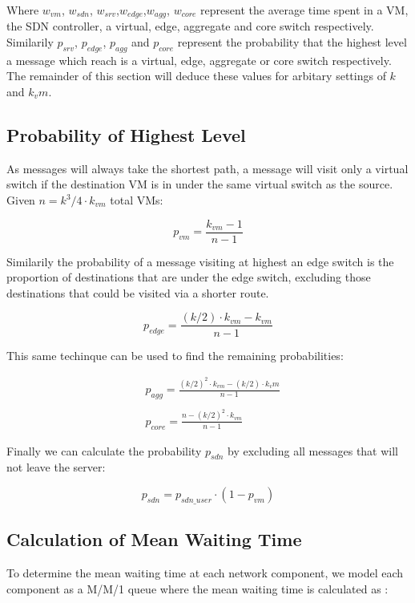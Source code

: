Where $w_{vm}$, $w_{sdn}$, $w_{srv}$,$w_{edge}$,$w_{agg}$, $w_{core}$ represent the average time spent in a VM, the SDN controller, a virtual, edge, aggregate and core switch respectively. Similarily $p_{srv}$, $p_{edge}$, $p_{agg}$ and $p_{core}$ represent the probability that the highest level a message which reach is a virtual, edge, aggregate or core switch respectively. The remainder of this section will deduce these values for arbitary settings of $k$ and $k_vm$.

\subsection{Probability of Highest Level}
As messages will always take the shortest path, a message will visit only a virtual switch if the destination VM is in under the same virtual switch as the source. Given $n=k^3/4 \cdot k_{vm}$ total VMs:

\begin{equation}
p_{vm} = \frac{k_{vm} - 1}{n - 1}
\end{equation}

Similarily the probability of a message visiting at highest an edge switch is the proportion of destinations that are under the edge switch, excluding those destinations that could be visited via a shorter route.

\begin{equation}
p_{edge} = \frac{(k/2) \cdot k_{vm} - k_{vm}}{n - 1}
\end{equation}

This same techinque can be used to find the remaining probabilities:

\begin{align}
&p_{agg} = \frac{(k/2)^2 \cdot k_{vm} - (k/2) \cdot k_vm}{n - 1} \\ \nonumber \\
&p_{core} = \frac{n - (k/2)^2 \cdot k_{vm}}{n - 1}
\end{align}

Finally we can calculate the probability $p_{sdn}$ by excluding all messages that will not leave the server:

\begin{equation}
p_{sdn} = p_{sdn\_user} \cdot (1 - p_{vm})
\end{equation}

\subsection{Calculation of Mean Waiting Time}
To determine the mean waiting time at each network component, we model each component as a M/M/1 queue where the mean waiting time is calculated as \cite{}:

